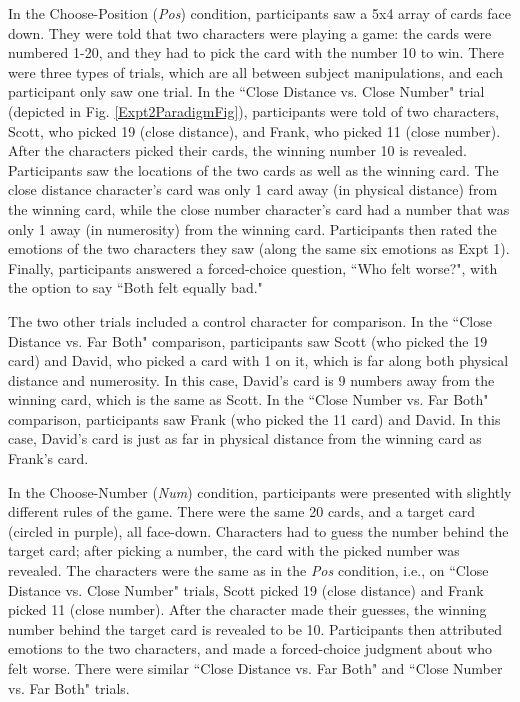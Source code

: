 \documentclass[10pt,letterpaper]{article}
\begin{document}
In the Choose-Position (\textit{Pos}) condition, participants saw a 5x4 array of cards face down. They were told that two characters were playing a game: the cards were numbered 1-20, and they had to pick the card with the number 10 to win. There were three types of trials, which are all between subject manipulations, and each participant only saw one trial. In the ``Close Distance vs. Close Number" trial (depicted in Fig. \ref{Expt2ParadigmFig}), participants were told of two characters, Scott, who picked 19 (close distance), and Frank, who picked 11 (close number). After the characters picked their cards, the winning number 10 is revealed. Participants saw the locations of the two cards as well as the winning card. The close distance character's card was only 1 card away (in physical distance) from the winning card, while the close number character's card had a number that was only 1 away (in numerosity) from the winning card. Participants then rated the emotions of the two characters they saw (along the same six emotions as Expt 1). Finally, participants answered a forced-choice question, ``Who felt worse?", with the option to say ``Both felt equally bad."

The two other trials included a control character for comparison. In the ``Close Distance vs. Far Both" comparison, participants saw Scott (who picked the 19 card) and David, who picked a card with 1 on it, which is far along both physical distance and numerosity. In this case, David's card is 9 numbers away from the winning card, which is the same as Scott. In the ``Close Number vs. Far Both" comparison, participants saw Frank (who picked the 11 card) and David. In this case, David's card is just as far in physical distance from the winning card as Frank's card.


In the Choose-Number (\textit{Num}) condition, participants were presented with slightly different rules of the game. There were the same 20 cards, and a target card (circled in purple), all face-down. Characters had to guess the number behind the target card; after picking a number, the card with the picked number was revealed. The characters were the same as in the \textit{Pos} condition, i.e., on ``Close Distance vs. Close Number" trials, Scott picked 19 (close distance) and Frank picked 11 (close number). After the character made their guesses, the winning number behind the target card is revealed to be 10. Participants then attributed emotions to the two characters, and made a forced-choice judgment about who felt worse. There were similar ``Close Distance vs. Far Both" and ``Close Number vs. Far Both" trials.
\end{document}
